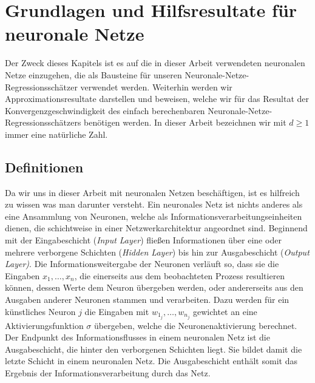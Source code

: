 \chapter{Grundlagen und Hilfsresultate für neuronale Netze}
\label{chap:1}

Der Zweck dieses Kapitels ist es auf die in dieser Arbeit verwendeten neuronalen Netze einzugehen, die als Bausteine für unseren Neuronale-Netze-Regressionsschätzer verwendet werden. Weiterhin werden wir Approximationsresultate darstellen und beweisen, welche wir für das Resultat der Konvergenzgeschwindigkeit des einfach berechenbaren Neuronale-Netze-Regressionsschätzers benötigen werden.
In dieser Arbeit bezeichnen wir mit $d \geq 1$ immer eine natürliche Zahl.

\section{Definitionen}
Da wir uns in dieser Arbeit mit neuronalen Netzen beschäftigen, ist es hilfreich zu wissen was man darunter versteht. Ein neuronales Netz ist nichts anderes als eine Ansammlung von Neuronen, welche als Informationsverarbeitungseinheiten dienen, die schichtweise in einer Netzwerkarchitektur angeordnet sind. Beginnend mit der Eingabeschicht (\textit{Input Layer}) fließen Informationen über eine oder mehrere verborgene Schichten (\textit{Hidden Layer}) bis hin zur Ausgabeschicht (\textit{Output Layer)}. Die Informationsweitergabe der Neuronen verläuft so, dass sie die Eingaben $x_1,\dots,x_n$, die einerseits aus dem beobachteten Prozess resultieren können, dessen Werte dem Neuron übergeben werden, oder andererseits aus den Ausgaben anderer Neuronen stammen und verarbeiten.
Dazu werden für ein künstliches Neuron $j$ die Eingaben mit $w_{1_j}, \dots, w_{n_j}$ gewichtet an eine Aktivierungsfunktion $\sigma$ übergeben, welche die Neuronenaktivierung berechnet. Der Endpunkt des Informationsflusses in einem neuronalen Netz ist die Ausgabeschicht, die hinter den verborgenen Schichten liegt. Sie bildet damit die letzte Schicht in einem neuronalen Netz. Die Ausgabeschicht enthält somit das Ergebnis der Informationsverarbeitung durch das Netz.  
